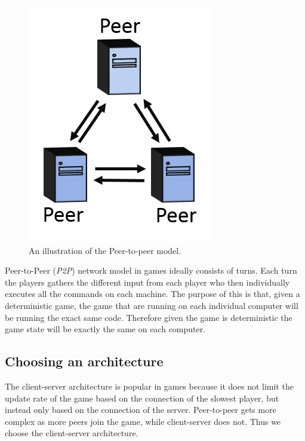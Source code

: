 \begin{figure}[H]
\centering
\includegraphics[scale=1]{figures/network/peer_peer}
\caption{An illustration of the Peer-to-peer model.}
\label{fig:peer_peer}
\end{figure}

Peer-to-Peer (\textit{P2P}) network model in games ideally consists of turns.
Each turn the players gathers the different input from each player who then individually executes all the commands on each machine.
The purpose of this is that, given a deterministic game, the game that are running on each individual computer will be running the exact same code. 
Therefore given the game is deterministic the game state will be exactly the same on each computer. 

\subsection{Choosing an architecture}
The client-server architecture is popular in games because it does not limit the update rate of the game based on the connection of the slowest player, but instead only based on the connection of the server.
Peer-to-peer gets more complex as more peers join the game, while client-server does not.
Thus we choose the client-server architecture.